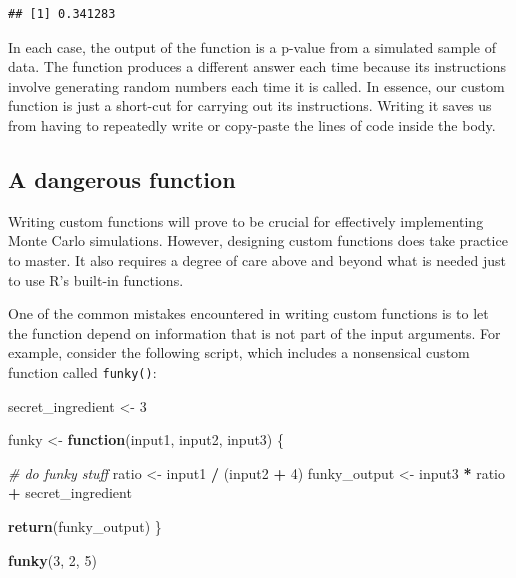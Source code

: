 \documentclass[
]{book}
\newenvironment{Shaded}{\begin{snugshade}}{\end{snugshade}}
\newcommand{\CommentTok}[1]{\textcolor[rgb]{0.56,0.35,0.01}{\textit{#1}}}
\newcommand{\ControlFlowTok}[1]{\textcolor[rgb]{0.13,0.29,0.53}{\textbf{#1}}}
\newcommand{\DecValTok}[1]{\textcolor[rgb]{0.00,0.00,0.81}{#1}}
\newcommand{\FunctionTok}[1]{\textcolor[rgb]{0.13,0.29,0.53}{\textbf{#1}}}
\newcommand{\NormalTok}[1]{#1}
\newcommand{\OtherTok}[1]{\textcolor[rgb]{0.56,0.35,0.01}{#1}}
\newcommand{\SpecialCharTok}[1]{\textcolor[rgb]{0.81,0.36,0.00}{\textbf{#1}}}
\begin{document}
\begin{verbatim}
## [1] 0.341283
\end{verbatim}

In each case, the output of the function is a p-value from a simulated sample of data. The function produces a different answer each time because its instructions involve generating random numbers each time it is called.
In essence, our custom function is just a short-cut for carrying out its instructions.
Writing it saves us from having to repeatedly write or copy-paste the lines of code inside the body.

\subsection{A dangerous function}\label{a-dangerous-function}

Writing custom functions will prove to be crucial for effectively implementing Monte Carlo simulations.
However, designing custom functions does take practice to master.
It also requires a degree of care above and beyond what is needed just to use R's built-in functions.

One of the common mistakes encountered in writing custom functions is to let the function depend on information that is not part of the input arguments.
For example, consider the following script, which includes a nonsensical custom function called \texttt{funky()}:

\begin{Shaded}
\begin{Highlighting}[]
\NormalTok{secret\_ingredient }\OtherTok{\textless{}{-}} \DecValTok{3}

\NormalTok{funky }\OtherTok{\textless{}{-}} \ControlFlowTok{function}\NormalTok{(input1, input2, input3) \{}
  
  \CommentTok{\# do funky stuff}
\NormalTok{  ratio }\OtherTok{\textless{}{-}}\NormalTok{ input1 }\SpecialCharTok{/}\NormalTok{ (input2 }\SpecialCharTok{+} \DecValTok{4}\NormalTok{)}
\NormalTok{  funky\_output }\OtherTok{\textless{}{-}}\NormalTok{ input3 }\SpecialCharTok{*}\NormalTok{ ratio }\SpecialCharTok{+}\NormalTok{ secret\_ingredient}
  
  \FunctionTok{return}\NormalTok{(funky\_output)  }
\NormalTok{\}}

\FunctionTok{funky}\NormalTok{(}\DecValTok{3}\NormalTok{, }\DecValTok{2}\NormalTok{, }\DecValTok{5}\NormalTok{)}
\end{Highlighting}
\end{Shaded}
\end{document}
